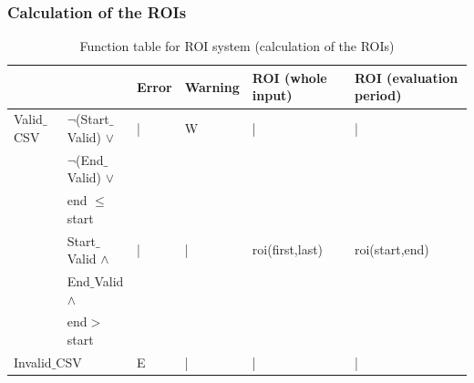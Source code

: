 \documentclass[runningheads,12pt]{article}
\begin{document}
\begin{landscape}
\subsubsection{Calculation of the ROIs}

\begin{table}[H]
{
\centering

\begin{tabular}{|l|l||l|l|l|l|}
\hline
\multicolumn{2}{|c||}{} & Error & Warning & ROI (whole input) & ROI (evaluation period)\\ 

\hline
Valid$\_$CSV & $\lnot$(Start$\_$Valid) $\vee$ & |& W & | & |\\ 
& $\lnot$(End$\_$Valid) $\vee$ &&&&\\
& end $\le$ start &&& &\\

\cline{2-6}
& Start$\_$Valid  $\wedge$ & |& | & roi(first,last) & roi(start,end)\\
& End$\_$Valid $\wedge$ &&&&\\
& end$>$start &&&&\\

\hline
\multicolumn{2}{|l||}{Invalid$\_$CSV} & E & |& | & |\\ 

\hline
\end{tabular}

\caption{Function table for ROI system (calculation of the ROIs)}
\label{table:ftable_ROI}
}
\end{table}
\end{landscape}

\end{document}
